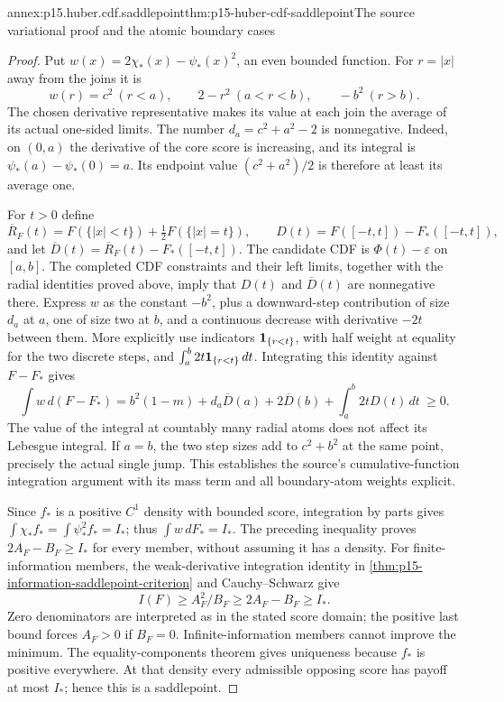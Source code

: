 \begin{annexitem}{annex:p15.huber.cdf.saddlepoint}{thm:p15-huber-cdf-saddlepoint}{The source variational proof and the atomic boundary cases}
\begin{proof}
Put \(w(x)=2\chi_*(x)-\psi_*(x)^2\), an even bounded function.
For \(r=|x|\) away from the joins it is
\[
 w(r)=c^2\ (r<a),\qquad
       2-r^2\ (a<r<b),\qquad -b^2\ (r>b).
\]
The chosen derivative representative makes its value at each join
the average of its actual one-sided limits.
The number \(d_a=c^2+a^2-2\) is nonnegative.
Indeed, on \((0,a)\) the derivative of the core score is increasing,
and its integral is \(\psi_*(a)-\psi_*(0)=a\).
Its endpoint value \((c^2+a^2)/2\) is therefore at least its
average one.

For \(t>0\) define
\[
 \overline R_F(t)=F(\{|x|<t\})+\tfrac12F(\{|x|=t\}),\qquad
 D(t)=F([-t,t])-F_*([-t,t]),
\]
and let \(\overline D(t)=\overline R_F(t)-F_*([-t,t])\).
The candidate CDF is \(\Phi(t)-\varepsilon\) on \([a,b]\).
The completed CDF constraints and their left limits, together
with the radial identities proved above, imply that \(D(t)\)
and \(\overline D(t)\) are nonnegative there.
Express \(w\) as the constant \(-b^2\), plus a downward-step
contribution of size \(d_a\) at \(a\), one of size two at \(b\),
and a continuous decrease with derivative \(-2t\) between them.
More explicitly use indicators \({\bf1}_{\{r<t\}}\), with half
weight at equality for the two discrete steps, and
\(\int_a^b2t{\bf1}_{\{r<t\}}\,dt\).
Integrating this identity against \(F-F_*\) gives
\[
 \int w\,d(F-F_*)=
 b^2(1-m)+d_a\overline D(a)+2\overline D(b)
                  +\int_a^b2tD(t)\,dt\ \geq0.
\]
The value of the integral at countably many radial atoms does not
affect its Lebesgue integral. If \(a=b\), the two step sizes add
to \(c^2+b^2\) at the same point, precisely the actual single jump.
This establishes the source's cumulative-function integration
argument with its mass term and all boundary-atom weights explicit.

Since \(f_*\) is a positive \(C^1\) density with bounded score,
integration by parts gives
\(\int\chi_* f_*=\int\psi_*^2f_*=I_*\); thus
\(\int w\,dF_*=I_*\).
The preceding inequality proves \(2A_F-B_F\geq I_*\) for
every member, without assuming it has a density.
For finite-information members, the weak-derivative integration
identity in \cref{thm:p15-information-saddlepoint-criterion}
and Cauchy--Schwarz give
\[
 I(F)\geq A_F^2/B_F\geq2A_F-B_F\geq I_*.
\]
Zero denominators are interpreted as in the stated score domain;
the positive last bound forces \(A_F>0\) if \(B_F=0\).
Infinite-information members cannot improve the minimum.
The equality-components theorem gives uniqueness because \(f_*\)
is positive everywhere. At that density every admissible opposing
score has payoff at most \(I_*\); hence this is a saddlepoint.


\end{proof}
\end{annexitem}
